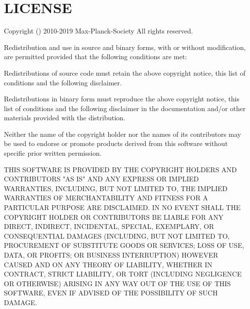\chapter{LICENSE}
\hypertarget{md__2home_2jam_2Research_2IRES-2025_2dev_2src_2llm-scripts_2testing_2hypothesis-testing_2hyp-envec8983e8c7ea65b06328b6df8453658b}{}\label{md__2home_2jam_2Research_2IRES-2025_2dev_2src_2llm-scripts_2testing_2hypothesis-testing_2hyp-envec8983e8c7ea65b06328b6df8453658b}
Copyright () 2010-\/2019 Max-\/\+Planck-\/\+Society All rights reserved.

Redistribution and use in source and binary forms, with or without modification, are permitted provided that the following conditions are met\+:


\begin{DoxyItemize}
\item Redistributions of source code must retain the above copyright notice, this list of conditions and the following disclaimer.
\item Redistributions in binary form must reproduce the above copyright notice, this list of conditions and the following disclaimer in the documentation and/or other materials provided with the distribution.
\item Neither the name of the copyright holder nor the names of its contributors may be used to endorse or promote products derived from this software without specific prior written permission.
\end{DoxyItemize}

THIS SOFTWARE IS PROVIDED BY THE COPYRIGHT HOLDERS AND CONTRIBUTORS "{}\+AS IS"{} AND ANY EXPRESS OR IMPLIED WARRANTIES, INCLUDING, BUT NOT LIMITED TO, THE IMPLIED WARRANTIES OF MERCHANTABILITY AND FITNESS FOR A PARTICULAR PURPOSE ARE DISCLAIMED. IN NO EVENT SHALL THE COPYRIGHT HOLDER OR CONTRIBUTORS BE LIABLE FOR ANY DIRECT, INDIRECT, INCIDENTAL, SPECIAL, EXEMPLARY, OR CONSEQUENTIAL DAMAGES (INCLUDING, BUT NOT LIMITED TO, PROCUREMENT OF SUBSTITUTE GOODS OR SERVICES; LOSS OF USE, DATA, OR PROFITS; OR BUSINESS INTERRUPTION) HOWEVER CAUSED AND ON ANY THEORY OF LIABILITY, WHETHER IN CONTRACT, STRICT LIABILITY, OR TORT (INCLUDING NEGLIGENCE OR OTHERWISE) ARISING IN ANY WAY OUT OF THE USE OF THIS SOFTWARE, EVEN IF ADVISED OF THE POSSIBILITY OF SUCH DAMAGE. 